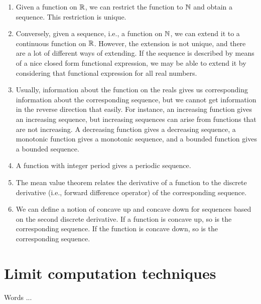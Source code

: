 \documentclass[10pt]{amsart}
\begin{document}
\begin{enumerate}
\item Given a function on $\mathbb{R}$, we can restrict the function to $\mathbb{N}$
  and obtain a sequence. This restriction is unique.
\item Conversely, given a sequence, i.e., a function on $\mathbb{N}$, we can
  extend it to a continuous function on $\mathbb{R}$. However, the extension
  is not unique, and there are a lot of different ways of
  extending. If the sequence is described by means of a nice closed
  form functional expression, we may be able to extend it by
  considering that functional expression for all real numbers.
\item Usually, information about the function on the reals gives us
  corresponding information about the corresponding sequence, but we
  cannot get information in the reverse direction that easily. For
  instance, an increasing function gives an increasing sequence, but
  increasing sequences can arise from functions that are not
  increasing. A decreasing function gives a decreasing sequence, a
  monotonic function gives a monotonic sequence, and a bounded
  function gives a bounded sequence.
\item A function with integer period gives a periodic sequence.
\item The mean value theorem relates the derivative of a function to
  the discrete derivative (i.e., forward difference operator) of the
  corresponding sequence.
\item We can define a notion of concave up and concave down for
  sequences based on the second discrete derivative. If a function is
  concave up, so is the corresponding sequence. If the function is
  concave down, so is the corresponding sequence.
\end{enumerate}

\section{Limit computation techniques}

Words ...
\end{document}

